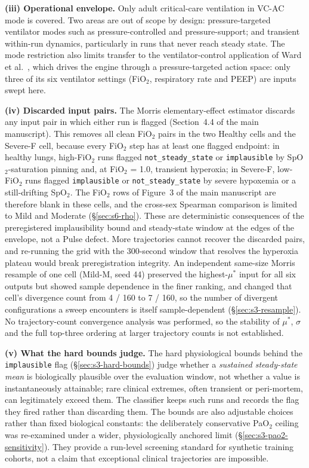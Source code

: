 \documentclass[pdflatex,sn-nature]{sn-jnl}%
\newcommand{\mainref}[2]{#2}
\begin{document}
\textbf{(iii) Operational envelope.} Only adult critical-care ventilation in VC-AC mode is covered. Two areas are out of scope by design: pressure-targeted ventilator modes such as pressure-controlled and pressure-support; and transient within-run dynamics, particularly in runs that never reach steady state. The mode restriction also limits transfer to the ventilator-control application of Ward et al.~\cite{ward2024ventilator}, which drives the engine through a pressure-targeted action space: only three of its six ventilator settings (FiO$_2$, respiratory rate and PEEP) are inputs swept here.

\textbf{(iv) Discarded input pairs.} The Morris elementary-effect estimator discards any input pair in which either run is flagged (Section~\mainref{sec:methods-detector}{4.4} of the main manuscript). This removes all clean FiO$_2$ pairs in the two Healthy cells and the Severe-F cell, because every FiO$_2$ step has at least one flagged endpoint: in healthy lungs, high-FiO$_2$ runs flagged \texttt{not\_steady\_state} or \texttt{implausible} by SpO$_2$-saturation pinning and, at FiO$_2$ = 1.0, transient hyperoxia; in Severe-F, low-FiO$_2$ runs flagged \texttt{implausible} or \texttt{not\_steady\_state} by severe hypoxemia or a still-drifting SpO$_2$. The FiO$_2$ rows of Figure~3 of the main manuscript are therefore blank in these cells, and the cross-sex Spearman comparison is limited to Mild and Moderate (\S\ref{sec:s6-rho}). These are deterministic consequences of the preregistered implausibility bound and steady-state window at the edges of the envelope, not a Pulse defect. More trajectories cannot recover the discarded pairs, and re-running the grid with the 300-second window that resolves the hyperoxia plateau would break preregistration integrity. An independent same-size Morris resample of one cell (Mild-M, seed 44) preserved the highest-$\mu^{*}$ input for all six outputs but showed sample dependence in the finer ranking, and changed that cell's divergence count from 4 / 160 to 7 / 160, so the number of divergent configurations a sweep encounters is itself sample-dependent (\S\ref{sec:s3-resample}). No trajectory-count convergence analysis was performed, so the stability of $\mu^{*}$, $\sigma$ and the full top-three ordering at larger trajectory counts is not established.

\textbf{(v) What the hard bounds judge.} The hard physiological bounds behind the \texttt{implausible} flag (\S\ref{sec:s3-hard-bounds}) judge whether a \emph{sustained steady-state mean} is biologically plausible over the evaluation window, not whether a value is instantaneously attainable; rare clinical extremes, often transient or peri-mortem, can legitimately exceed them. The classifier keeps such runs and records the flag they fired rather than discarding them. The bounds are also adjustable choices rather than fixed biological constants: the deliberately conservative PaO$_2$ ceiling was re-examined under a wider, physiologically anchored limit (\S\ref{sec:s3-pao2-sensitivity}). They provide a run-level screening standard for synthetic training cohorts, not a claim that exceptional clinical trajectories are impossible.
\end{document}
